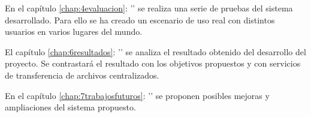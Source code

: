 En el capítulo \ref{chap:4evaluacion}: '' se realiza una
serie de pruebas del sistema desarrollado. Para ello se ha creado un escenario de uso real con distintos usuarios en varios lugares del mundo.

El capítulo \ref{chap:6resultados}: '' se analiza el resultado obtenido del desarrollo del proyecto. Se contrastará
el resultado con los objetivos propuestos y con servicios de transferencia de archivos centralizados.

En el capítulo \ref{chap:7trabajosfuturos}: '' se proponen posibles mejoras y ampliaciones del sistema propuesto.